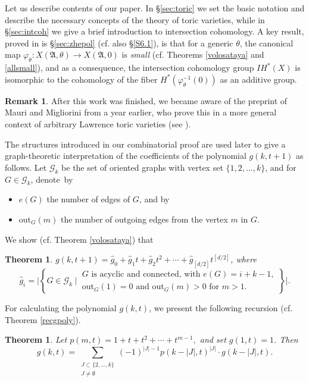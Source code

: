 \documentclass[11pt]{article}
\newtheorem{theorem}[theo]{Theorem}
\theoremstyle{definition}
\newtheorem{rema}[theo]{Remark}
\numberwithin{equation}{section}
\newcommand{\A}{\mathfrak{A}}
\begin{document}
Let us describe contents of our paper. In \S\ref{sec:toric} we set the basic 
notation and describe the necessary concepts of the theory of toric varieties, 
while in \S\ref{sec:intcoh} we give a  brief introduction to intersection 
cohomology.  A key result, proved in is \S\ref{sec:zhepol} (cf.  also 
\S\ref{S6.1}), is that for a generic $ 
\theta $, the canonical map $ \varphi_\theta:X(\A,\theta) \to X(\A,0)$ is \textit{small} 
(cf.  Theorems \ref{volosataya} and \ref{allsmall}), and as a consequence,
the intersection cohomology group $ IH^*(X) $ is isomorphic to the 
cohomology of the fiber $ H^*(\varphi_\theta^{-1}(0)) $ as an additive group.
\begin{rema}\label{remmm}
	After this work was finished, we became aware of the preprint \cite{MM} of 
Mauri and Migliorini from a year earlier, who prove this in a more general 
context of arbitrary Lawrence toric varieties (see \cite[Proposition 4.17]{MM}).
\end{rema}
The structures introduced in our combinatorial 
proof  are used later to give a graph-theoretic interpretation of the 
coefficients of the polynomial $g(k,t+1)$
as follows.  Let $ \mathcal{G}_{k} $ be the set of oriented graphs with vertex 
set 
$\{1, 2, \ldots, k\}$, and for $ G\in\mathcal{G}_{k} $,  denote~by \begin{itemize}
\item  $e(G) $ the number 
of edges of $ G $, and by 
\item $ \mathrm{out}_G(m) $ the number of outgoing edges from the vertex $ m $ in $ G $.
\end{itemize}
 We show (cf.  Theorem \ref{volosataya}) that 
 \begin{theorem} $g(k,t+1) = \hat{g}_0+ \hat{g}_1t+\hat{g}_2t^2+ \cdots +\hat{g}_{[d/2]} t^{[d/2]}$, where
\[
   \hat{g}_i = \bigg| \left\{ G\in\mathcal{G}_{k} \ \bigg\vert\
   \begin{array}{l}
    G \text{ is acyclic and connected, with } e(G)=i+k-1, \\
    \mathrm{out}_G(1)=0 \text{ and } \mathrm{out}_G(m)>0\text { for }m>1.
  \end{array}\right\} \bigg|.
\]
\end{theorem}
For calculating the polynomial $ g(k, t) $, we present the following recursion 
(cf.  Theorem \ref{recgpoly}).
\begin{theorem}
Let $p(m,t)=1+t+t^2+ \cdots +t^{m-1},$
and set $g(1,t)=1$. 
Then 
\begin{equation*}
g(k,t)= \sum_{\substack{J\subset\{2, \ldots ,k\} \\ J\neq\emptyset}}  (-1)^{|J|-1}p(k-|J|,t)^{|J|} \cdot g(k-|J|,t).
\end{equation*}
\end{theorem}
\end{document}
